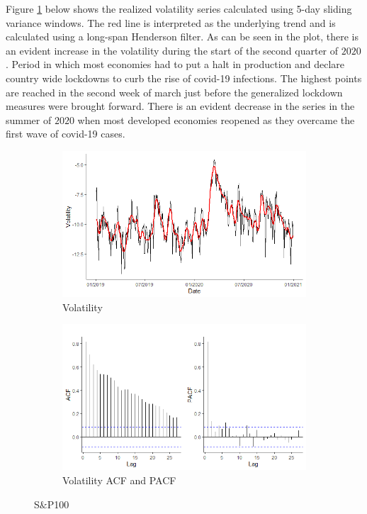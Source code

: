 \documentclass[a4paper, 12pt]{report}
\begin{document}
    Figure \ref{Fig:variance} below shows the realized volatility series calculated using 5-day sliding variance windows. The red line is interpreted as the underlying trend and is calculated using a long-span Henderson filter. As can be seen in the plot, there is an evident increase in the volatility during the start of the second quarter of $2020$. Period in which most economies had to put a halt in production and declare country wide lockdowns to curb the rise of covid-19 infections. The highest points are reached in the second week of march just before the generalized lockdown measures were brought forward.  There is an evident decrease in the series in the summer of $2020$ when most developed economies reopened as they overcame the first wave of covid-19 cases. 
    
        \begin{figure}[H]
    \begin{subfigure}[t]{.5\textwidth}
        \centering
        \includegraphics[width=\textwidth]{graphs/Variance.png}
        \caption{Volatility}
        \label{Fig:variance}
    \end{subfigure}
    \begin{subfigure}[t]{.5\textwidth}
        \centering
        \includegraphics[width=\textwidth]{graphs/Variance_ACF.png}
        \caption{Volatility ACF and PACF}
        \label{Fig:varianceacf}
    \end{subfigure}
    \caption{S$\&$P100}
    \label{Fig:variance_plots}
    \end{figure}
    
\end{document}
